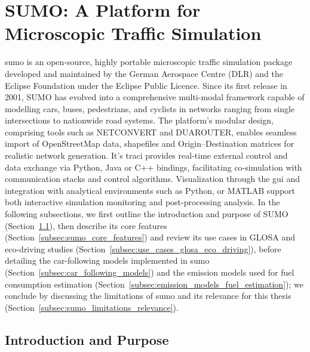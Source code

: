 \section{SUMO: A Platform for Microscopic Traffic Simulation}
\label{sec:SUMO}

\ac{sumo} is an open-source, highly portable microscopic traffic simulation package developed and maintained by the German Aerospace Centre (DLR) and the Eclipse Foundation under the Eclipse Public Licence. \cite{SUMOWebsite2025}\cite{EclipseNews2017} Since its first release in 2001, SUMO has evolved into a comprehensive multi-modal framework capable of modelling cars, buses, pedestrians, and cyclists in networks ranging from single intersections to nationwide road systems. \cite{SUMODocs2025}\cite{Krajzewicz2002} The platform’s modular design, comprising tools such as NETCONVERT and DUAROUTER, enables seamless import of OpenStreetMap data, shapefiles and Origin–Destination matrices for realistic network generation. \cite{SUMODocs2025} It's \ac{traci} provides real-time external control and data exchange via Python, Java or C++ bindings, facilitating co-simulation with communication stacks and control algorithms. Visualization through the \ac{gui} and integration with analytical environments such as Python, or MATLAB support both interactive simulation monitoring and post-processing analysis. \cite{TraCIDocs2024} 
\mynewline
In the following subsections, we first outline the introduction and purpose of SUMO (Section~\ref{subsec:sumo_intro_purpose}), then describe its core features (Section~\ref{subsec:sumo_core_features}) and review its use cases in GLOSA and eco-driving studies (Section~\ref{subsec:use_cases_glosa_eco_driving}), before detailing the car-following models implemented in \ac{sumo} (Section~\ref{subsec:car_following_models}) and the emission models used for fuel consumption estimation (Section~\ref{subsec:emission_models_fuel_estimation}); we conclude by discussing the limitations of \ac{sumo} and its relevance for this thesis (Section~\ref{subsec:sumo_limitations_relevance}).  


\subsection{Introduction and Purpose}
\label{subsec:sumo_intro_purpose}

